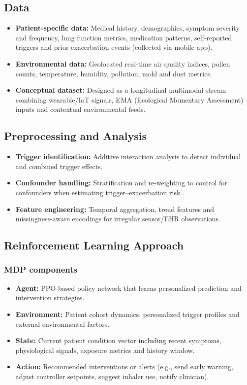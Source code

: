 \subsection*{Data}
\begin{itemize}
    \item \textbf{Patient-specific data:} Medical history, demographics, symptom severity and frequency, lung function metrics, medication patterns, self-reported triggers and prior exacerbation events (collected via mobile app).
    \item \textbf{Environmental data:} Geolocated real-time air quality indices, pollen counts, temperature, humidity, pollution, mold and dust metrics.
    \item \textbf{Conceptual dataset:} Designed as a longitudinal multimodal stream combining wearable/IoT signals, EMA (Ecological Momentary Assessment) inputs and contextual environmental feeds.
\end{itemize}

\subsection*{Preprocessing and Analysis}
\begin{itemize}
    \item \textbf{Trigger identification:} Additive interaction analysis to detect individual and combined trigger effects.
    \item \textbf{Confounder handling:} Stratification and re-weighting to control for confounders when estimating trigger–exacerbation risk.
    \item \textbf{Feature engineering:} Temporal aggregation, trend features and missingness-aware encodings for irregular sensor/EHR observations.
\end{itemize}

\subsection*{Reinforcement Learning Approach}
\subsubsection*{MDP components}
\begin{itemize}
    \item \textbf{Agent:} PPO-based policy network that learns personalized prediction and intervention strategies.
    \item \textbf{Environment:} Patient cohort dynamics, personalized trigger profiles and external environmental factors.
    \item \textbf{State:} Current patient condition vector including recent symptoms, physiological signals, exposure metrics and history window.
    \item \textbf{Action:} Recommended interventions or alerts (e.g., send early warning, adjust controller setpoints, suggest inhaler use, notify clinician).
\end{itemize}

